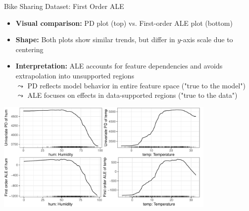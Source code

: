 \documentclass[10pt,compress,t,notes=noshow, xcolor=table]{beamer}
\begin{document}
\begin{frame}{Bike Sharing Dataset: First Order ALE}

\begin{itemize}
  \item \textbf{Visual comparison:} PD plot (top) vs. First-order ALE plot (bottom)
  \item \textbf{Shape:} Both plots show similar trends, but differ in $y$-axis scale due to centering
  \item \textbf{Interpretation:} ALE accounts for feature dependencies and avoids extrapolation into unsupported regions
  \\$\leadsto$ PD reflects model behavior in entire feature space ("true to the model")\\
  $\leadsto$ ALE focuses on effects in data-supported regions ("true to the data")
\end{itemize}

\begin{center}
\includegraphics[width=0.8\textwidth]{figure/ale1d}
\end{center}


\end{frame}

\end{document}
